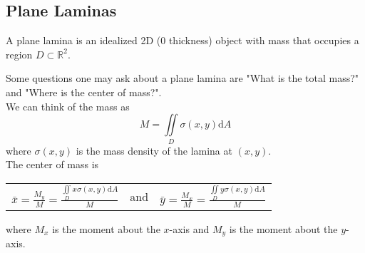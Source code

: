 \subsection{Plane Laminas}
\begin{definition}
	A plane lamina is an idealized 2D (0 thickness) object with mass that occupies a region $D \subset \mathbb{R}^2$.
\end{definition}

\noindent
Some questions one may ask about a plane lamina are "What is the total mass?" and "Where is the center of mass?".\\
We can think of the mass as $$M = \iint\limits_{D}{\sigma(x,y)\mathrm{d}A}$$ where $\sigma(x,y)$ is the mass density of the lamina at $(x,y)$.\\
The center of mass is
\begin{center}
	\begin{tabular}{ccc}
	 	$\bar{x} = \frac{M_y}{M} = \frac{\iint\limits_{D}{x\sigma(x,y)\mathrm{d}A}}{M}$ & and & $\bar{y} = \frac{M_x}{M} = \frac{\iint\limits_{D}{y\sigma(x,y)\mathrm{d}A}}{M}$
	\end{tabular}
\end{center}
where $M_x$ is the moment about the $x$-axis and $M_y$ is the moment about the $y$-axis.